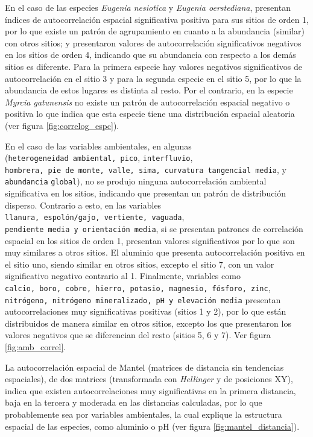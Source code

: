 \documentclass[11pt,]{article}
\begin{document}
En el caso de las especies \emph{Eugenia nesiotica} y \emph{Eugenia
oerstediana}, presentan índices de autocorrelación espacial
significativa positiva para sus sitios de orden 1, por lo que existe un
patrón de agrupamiento en cuanto a la abundancia (similar) con otros
sitios; y presentaron valores de autocorrelación significativos
negativos en los sitios de orden 4, indicando que su abundancia con
respecto a los demás sitios es diferente. Para la primera especie hay
valores negativos significativos de autocorrelación en el sitio 3 y para
la segunda especie en el sitio 5, por lo que la abundancia de estos
lugares es distinta al resto. Por el contrario, en la especie
\emph{Myrcia gatunensis} no existe un patrón de autocorrelación espacial
negativo o positiva lo que indica que esta especie tiene una
distribución espacial aleatoria (ver figura \ref{fig:correlog_espc}).

En el caso de las variables ambientales, en algunas
(\texttt{heterogeneidad\ ambiental,\ pico}, \texttt{interfluvio},
\texttt{hombrera,\ pie\ de\ monte,\ valle,\ sima,\ curvatura\ tangencial\ media},
y \texttt{abundancia} \texttt{global}), no se produjo ninguna
autocorrelación ambiental significativa en los sitios, indicando que
presentan un patrón de distribución disperso. Contrario a esto, en las
variables \texttt{llanura,\ espolón/gajo,\ vertiente,\ vaguada},
\texttt{pendiente\ media\ y\ orientación\ media}, si se presentan
patrones de correlación espacial en los sitios de orden 1, presentan
valores significativos por lo que son muy similares a otros sitios. El
aluminio que presenta autocorrelación positiva en el sitio uno, siendo
similar en otros sitios, excepto el sitio 7, con un valor significativo
negativo contrario al 1. Finalmente, variables como
\texttt{calcio,\ boro,\ cobre,\ hierro,\ potasio,\ magnesio,\ fósforo,\ zinc},
\texttt{nitrógeno,\ nitrógeno\ mineralizado,\ pH\ y\ elevación\ media}
presentan autocorrelaciones muy significativas positivas (sitios 1 y 2),
por lo que están distribuidos de manera similar en otros sitios, excepto
los que presentaron los valores negativos que se diferencian del resto
(sitios 5, 6 y 7). Ver figura \ref{fig:amb_correl}.

La autocorrelación espacial de Mantel (matrices de distancia sin
tendencias espaciales), de dos matrices (transformada con
\emph{Hellinger} y de posiciones XY), indica que existen
autocorrelaciones muy significativas en la primera distancia, baja en la
tercera y moderada en las distancias calculadas, por lo que
probablemente sea por variables ambientales, la cual explique la
estructura espacial de las especies, como aluminio o pH (ver figura
\ref{fig:mantel_distancia}).
\end{document}

